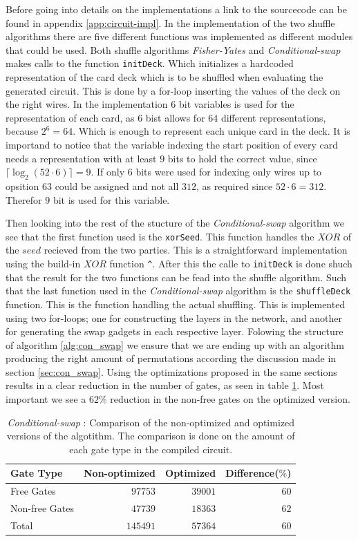 \documentclass[twoside,11pt,openright]{report}
\newcommand{\FY}{\textit{Fisher-Yates} }
\newcommand{\CS}{\textit{Conditional-swap} }
\begin{document}
Before going into details on the implementations a link to the sourcecode can be found in appendix \ref{app:circuit-impl}. In the implementation of the two shuffle algorithms there are five different functions was implemented as different modules that could be used. Both shuffle algorithms \FY and \CS makes calls to the function \verb|initDeck|. Which initializes a hardcoded representation of the card deck which is to be shuffled when evaluating the generated circuit. This is done by a for-loop inserting the values of the deck on the right wires. In the implementation $6$ bit variables is used for the representation of each card, as $6$ bist allows for $64$ different representations, because $2^6=64$. Which is enough to represent each unique card in the deck. It is importand to notice that the variable indexing the start position of every card needs a representation with at least $9$ bits to hold the correct value, since $\lceil \log_2(52\cdot 6)\rceil=9$. If only $6$ bits were used for indexing only wires up to opsition $63$ could be assigned and not all $312$, as required since $52\cdot 6=312$. Therefor $9$ bit is used for this variable.

\bigskip

Then looking into the rest of the stucture of the \CS algorithm we see that the first function used is the \verb|xorSeed|. This function handles the $XOR$ of the $seed$ recieved from the two parties. This is a straightforward implementation using the build-in $XOR$ function \verb|^|. After this the calle to \verb|initDeck| is done shuch that the result for the two functions can be fead into the shuffle algorithm. Such that the last function used in the \CS algorithm is the \verb|shuffleDeck| function. This is the function handling the actual shuffling. This is implemented using two for-loops; one for constructing the layers in the network, and another for generating the swap gadgets in each respective layer. Folowing the structure of algorithm \ref{alg:con_swap} we ensure that we are ending up with an algorithm producing the right amount of permutations according the discussion made in section \ref{sec:con_swap}. Using the optimizations proposed in the same sections results in a clear reduction in the number of gates, as seen in table \ref{table:con_swap_comp}. Most important we see a $62\%$ reduction in the non-free gates on the optimized version.

\begin{table}
\centering
\begin{tabular}{l || r r r}
Gate Type      & Non-optimized  & Optimized & Difference($\%$)    \\
\hline
Free Gates     &  $97753$       & $39001$   & $60$ \\
Non-free Gates &  $47739$       & $18363$   & $62$ \\
\hline
Total          & $145491$       & $57364$   & $60$
\end{tabular}
\caption{\CS: Comparison of the non-optimized and optimized versions of the algotithm. The comparison is done on the amount of each gate type in the compiled circuit.}
\label{table:con_swap_comp}
\end{table}
\end{document}
